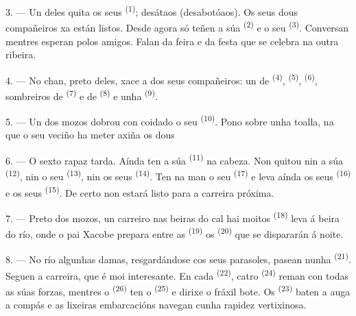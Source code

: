 3. --- Un deles quita os seus  \textsuperscript{(1)}; desátaos (desabotóaos).
Os seus dous compañeiros xa están listos. Desde agora só teñen a súa
 \textsuperscript{(2)} e o seu 
\textsuperscript{(3)}. Conversan mentres esperan polos amigos. Falan da feira e da festa que
se celebra na outra ribeira.

4. --- No chan, preto deles, xace a  dos seus compañeiros: un
 de  \textsuperscript{(4)}, 
\textsuperscript{(5)},  \textsuperscript{(6)}, sombreiros de
 \textsuperscript{(7)} e de  \textsuperscript{(8)} e unha
 \textsuperscript{(9)}.

5. --- Un dos mozos dobrou con coidado o seu  \textsuperscript{(10)}. Pono sobre
unha toalla, na que o seu veciño ha meter axiña os dous 

6. --- O sexto rapaz tarda. Aínda ten a súa  \textsuperscript{(11)} na cabeza.
Non quitou nin a súa  \textsuperscript{(12)}, nin o seu
 \textsuperscript{(13)}, nin os seus 
\textsuperscript{(14)}. Ten na man o seu  \textsuperscript{(17)} e leva aínda
os seus  \textsuperscript{(16)} e os seus
 \textsuperscript{(15)}. De certo non estará listo para a carreira
próxima.

7. --- Preto dos mozos, un carreiro nas beiras do cal hai moitos 
\textsuperscript{(18)} leva á beira do río, onde o pai Xacobe prepara entre as
 \textsuperscript{(19)} os 
\textsuperscript{(20)} que se dispararán á noite.

\VUsaut{4.4mm}
\VUsaut{3.4mm}

8. --- No río algunhas damas, resgardándose cos seus parasoles, pasean nunha
 \textsuperscript{(21)}. Seguen a carreira, que é moi interesante. En
cada  \textsuperscript{(22)}, catro  \textsuperscript{(24)}
reman con todas as súas forzas, mentres o  \textsuperscript{(26)} ten o
 \textsuperscript{(25)} e dirixe o fráxil bote. Os 
\textsuperscript{(23)} baten a auga a compás e as lixeiras embarcacións navegan cunha rapidez
vertixinosa.

